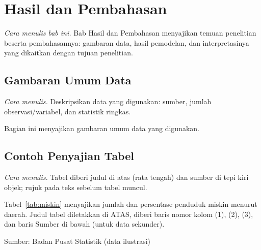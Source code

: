 \chapter{Hasil dan Pembahasan}
\emph{Cara menulis bab ini.} Bab Hasil dan Pembahasan menyajikan temuan penelitian beserta pembahasannya: gambaran data, hasil pemodelan, dan interpretasinya yang dikaitkan dengan tujuan penelitian.


\section{Gambaran Umum Data}
\emph{Cara menulis.} Deskripsikan data yang digunakan: sumber, jumlah observasi/variabel, dan statistik ringkas.

Bagian ini menyajikan gambaran umum data yang digunakan.

\section{Contoh Penyajian Tabel}
\emph{Cara menulis.} Tabel diberi judul di atas (rata tengah) dan sumber di tepi kiri objek; rujuk pada teks sebelum tabel muncul.

Tabel~\ref{tab:miskin} menyajikan jumlah dan persentase penduduk miskin menurut
daerah. Judul tabel diletakkan di ATAS, diberi baris nomor kolom (1), (2), (3),
dan baris Sumber di bawah (untuk data sekunder).

\begin{table}[H]
\centering
\caption{Jumlah dan persentase penduduk miskin menurut daerah}
\label{tab:miskin}
\sbox{}%
\usebox\skripsiblokbox\par
\addvspace{0.4\spasi}
\parbox[t]{\wd\skripsiblokbox}{\raggedright\setlength{\parindent}{0pt}\small Sumber: Badan Pusat Statistik (data ilustrasi)}
\end{table}

